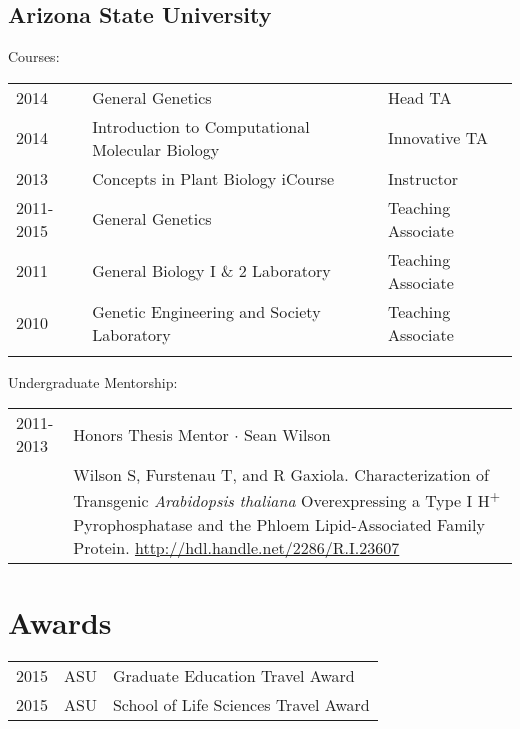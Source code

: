 \documentclass[11pt]{article}
\begin{document}
\subsection*{Arizona State University}
Courses:\\
\begin{tabularx}{\linewidth}{llX}
2014&General Genetics& Head TA\\
2014& Introduction to Computational Molecular Biology& Innovative TA\\
2013&Concepts in Plant Biology iCourse& Instructor\\
2011-2015&General Genetics&Teaching Associate\\
2011&General Biology I \& 2 Laboratory& Teaching Associate\\
2010&Genetic Engineering and Society Laboratory&Teaching Associate\\\\
\end{tabularx}
Undergraduate Mentorship:\\
\begin{tabularx}{\linewidth}{lX}
2011-2013&Honors Thesis Mentor $\cdotp$ Sean Wilson\\
&Wilson S, Furstenau T, and R Gaxiola. Characterization of Transgenic \textit{Arabidopsis thaliana} Overexpressing a Type I H\textsuperscript{+} Pyrophosphatase and the Phloem Lipid-Associated Family Protein. \href{http://hdl.handle.net/2286/R.I.23607}{http://hdl.handle.net/2286/R.I.23607}\\
\end{tabularx}


\section*{Awards}
\begin{tabularx}{\linewidth}{llX}
2015 & ASU &Graduate Education Travel Award\\
2015 & ASU &School of Life Sciences Travel Award\\
\end{tabularx}
\end{document}
